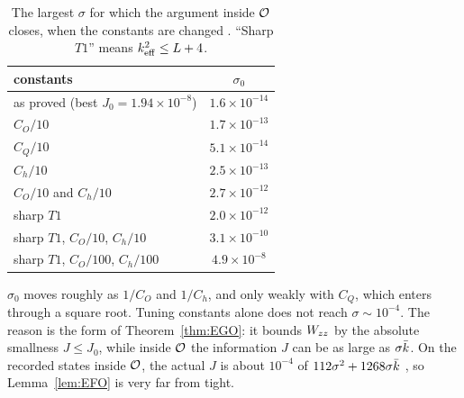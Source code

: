 \begin{table}[h]
\caption{The largest $\sigma$ for which the argument inside $\mathcal O$ closes, when the constants are changed \derivst. ``Sharp $T1$'' means $k_{\mathrm{eff}}^2\le L+4$.}
\label{tab:range}
\begin{ruledtabular}
\begin{tabular}{lc}
constants & $\sigma_0$\\
\hline
as proved (best $J_0=1.94\times10^{-8}$) & $1.6\times10^{-14}$\\
$C_O/10$ & $1.7\times10^{-13}$\\
$C_Q/10$ & $5.1\times10^{-14}$\\
$C_h/10$ & $2.5\times10^{-13}$\\
$C_O/10$ and $C_h/10$ & $2.7\times10^{-12}$\\
sharp $T1$ & $2.0\times10^{-12}$\\
sharp $T1$, $C_O/10$, $C_h/10$ & $3.1\times10^{-10}$\\
sharp $T1$, $C_O/100$, $C_h/100$ & $4.9\times10^{-8}$
\end{tabular}
\end{ruledtabular}
\end{table}

$\sigma_0$ moves roughly as $1/C_O$ and $1/C_h$, and only weakly with $C_Q$, which enters through a square root.
Tuning constants alone does not reach $\sigma\sim10^{-4}$.
The reason is the form of Theorem~\ref{thm:EGO}: it bounds $W_{zz}$ by the absolute smallness $J\le J_0$, while inside $\mathcal O$ the information $J$ can be as large as $\sigma\bar k$.
On the recorded states inside $\mathcal O$, the actual $J$ is about $10^{-4}$ of $112\sigma^2+1268\sigma\bar k$ \numst, so Lemma~\ref{lem:EFO} is very far from tight.
